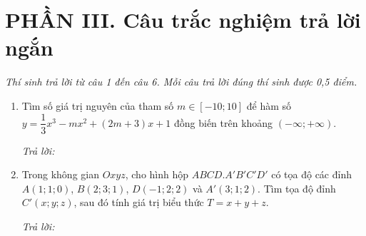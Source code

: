 \documentclass[12pt,a4paper]{article}
\newcommand{\otraloi}{\par\nobreak\smallskip\noindent\textit{Trả lời:}\quad\fbox{\rule{0pt}{11pt}\makebox[0.3cm]{}}\,\fbox{\rule{0pt}{11pt}\makebox[0.3cm]{}}\,\fbox{\rule{0pt}{11pt}\makebox[0.3cm]{}}\,\fbox{\rule{0pt}{11pt}\makebox[0.3cm]{}}}
\begin{document}
\vspace{3pt}
\section*{\large PHẦN III. Câu trắc nghiệm trả lời ngắn}
\textit{Thí sinh trả lời từ câu 1 đến câu 6. Mỗi câu trả lời đúng thí sinh được 0,5 điểm.}
\begin{enumerate}
\item Tìm số giá trị nguyên của tham số $m\in[-10;10]$ để hàm số $y=\dfrac{1}{3}x^3-mx^2+(2m+3)x+1$ đồng biến trên khoảng $(-\infty;+\infty)$.
\otraloi

\item Trong không gian $Oxyz$, cho hình hộp $ABCD.A'B'C'D'$ có tọa độ các đỉnh $A(1;1;0)$, $B(2;3;1)$, $D(-1;2;2)$ và $A'(3;1;2)$. Tìm tọa độ đỉnh $C'(x;y;z)$, sau đó tính giá trị biểu thức $T=x+y+z$.
\otraloi
\end{enumerate}
\end{document}
